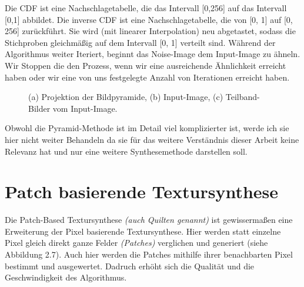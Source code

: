 \documentclass[12pt, a4paper,twoside,openright]{report}
\begin{document}
Die CDF ist eine Nachschlagetabelle, die das Intervall {[0,256]} auf das Intervall {[0,1]} abbildet.
Die inverse CDF ist eine Nachschlagetabelle, die von {[0, 1]} auf {[0, 256]} zurückführt.
Sie wird {(mit linearer Interpolation)} neu abgetastet,
sodass die Stichproben gleichmäßig auf dem Intervall {[0, 1]} verteilt sind. \cite{Heeger}
\newline
Während der Algorithmus weiter Iteriert, beginnt das Noise-Image dem Input-Image zu ähneln.
Wir Stoppen die den Prozess, wenn wir eine ausreichende Ähnlichkeit erreicht haben oder wir eine von uns festgelegte Anzahl von Iterationen erreicht haben.

\begin{figure}[H]
    \centering
    \qquad
    \qquad
    \caption{(a) Projektion der Bildpyramide, (b) Input-Image, (c) Teilband-Bilder vom Input-Image.}%
\end{figure}

Obwohl die Pyramid-Methode ist im Detail viel komplizierter ist,
werde ich sie hier nicht weiter Behandeln da sie für das weitere Verständnis dieser Arbeit keine Relevanz hat und nur eine weitere Synthesemethode darstellen soll.

\section{Patch basierende Textursynthese}

Die Patch-Based Textursynthese \textit{(auch Quilten genannt)} ist gewissermaßen eine Erweiterung der Pixel basierende Textursynthese.
Hier werden statt einzelne Pixel gleich direkt ganze Felder \textit{(Patches)} verglichen und generiert {(siehe Abbildung 2.7)}.
Auch hier werden die Patches mithilfe ihrer benachbarten Pixel bestimmt und ausgewertet.
Dadruch erhöht sich die Qualität und die Geschwindigkeit des Algorithmus.
\end{document}
